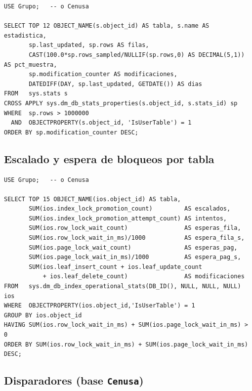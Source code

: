 \documentclass[11pt,a4paper]{article}
\newcommand{\cod}[1]{\texttt{\small #1}}
\begin{document}
\begin{lstlisting}[style=sql]
USE Grupo;   -- o Cenusa

SELECT TOP 12 OBJECT_NAME(s.object_id) AS tabla, s.name AS estadistica,
       sp.last_updated, sp.rows AS filas,
       CAST(100.0*sp.rows_sampled/NULLIF(sp.rows,0) AS DECIMAL(5,1)) AS pct_muestra,
       sp.modification_counter AS modificaciones,
       DATEDIFF(DAY, sp.last_updated, GETDATE()) AS dias
FROM   sys.stats s
CROSS APPLY sys.dm_db_stats_properties(s.object_id, s.stats_id) sp
WHERE  sp.rows > 1000000
  AND  OBJECTPROPERTY(s.object_id, 'IsUserTable') = 1
ORDER BY sp.modification_counter DESC;
\end{lstlisting}

\subsection{Escalado y espera de bloqueos por tabla}

\begin{lstlisting}[style=sql]
USE Grupo;   -- o Cenusa

SELECT TOP 15 OBJECT_NAME(ios.object_id) AS tabla,
       SUM(ios.index_lock_promotion_count)         AS escalados,
       SUM(ios.index_lock_promotion_attempt_count) AS intentos,
       SUM(ios.row_lock_wait_count)                AS esperas_fila,
       SUM(ios.row_lock_wait_in_ms)/1000           AS espera_fila_s,
       SUM(ios.page_lock_wait_count)               AS esperas_pag,
       SUM(ios.page_lock_wait_in_ms)/1000          AS espera_pag_s,
       SUM(ios.leaf_insert_count + ios.leaf_update_count
           + ios.leaf_delete_count)                AS modificaciones
FROM   sys.dm_db_index_operational_stats(DB_ID(), NULL, NULL, NULL) ios
WHERE  OBJECTPROPERTY(ios.object_id,'IsUserTable') = 1
GROUP BY ios.object_id
HAVING SUM(ios.row_lock_wait_in_ms) + SUM(ios.page_lock_wait_in_ms) > 0
ORDER BY SUM(ios.row_lock_wait_in_ms) + SUM(ios.page_lock_wait_in_ms) DESC;
\end{lstlisting}

\subsection{Disparadores (base \cod{Cenusa})}
\end{document}
